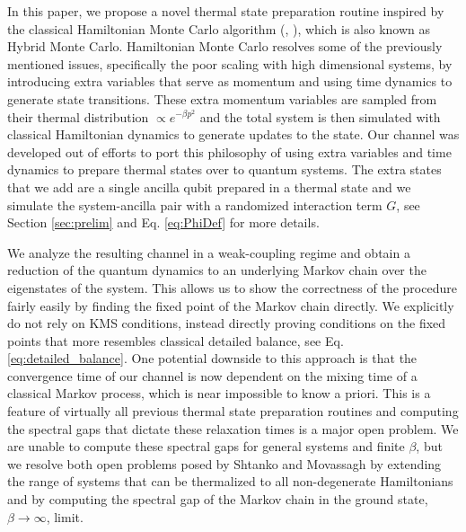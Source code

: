 In this paper, we propose a novel thermal state preparation routine inspired by the classical Hamiltonian Monte Carlo algorithm (\cite{neal1993probabilistic}, \cite{hoffman2011nouturnsampleradaptivelysetting}), which is also known as Hybrid Monte Carlo. Hamiltonian Monte Carlo resolves some of the previously mentioned issues, specifically the poor scaling with high dimensional systems, by introducing extra variables that serve as momentum and using time dynamics to generate state transitions. These extra momentum variables are sampled from their thermal distribution $\propto e^{-\beta p^2}$ and the total system is then simulated with classical Hamiltonian dynamics to generate updates to the state. Our channel was developed out of efforts to port this philosophy of using extra variables and time dynamics to prepare thermal states over to quantum systems. The extra states that we add are a single ancilla qubit prepared in a thermal state and we simulate the system-ancilla pair with a randomized interaction term $G$, see Section \ref{sec:prelim} and Eq. \eqref{eq:PhiDef} for more details. 

We analyze the resulting channel in a weak-coupling regime and obtain a reduction of the quantum dynamics to an underlying Markov chain over the eigenstates of the system. This allows us to show the correctness of the procedure fairly easily by finding the fixed point of the Markov chain directly. We explicitly do not rely on KMS conditions, instead directly proving conditions on the fixed points that more resembles classical detailed balance, see Eq. \eqref{eq:detailed_balance}. One potential downside to this approach is that the convergence time of our channel is now dependent on the mixing time of a classical Markov process, which is near impossible to know a priori. This is a feature of virtually all previous thermal state preparation routines and computing the spectral gaps that dictate these relaxation times is a major open problem. We are unable to compute these spectral gaps for general systems and finite $\beta$, but we resolve both open problems posed by Shtanko and Movassagh \cite{shtanko2023preparingthermalstatesnoiseless} by extending the range of systems that can be thermalized to all non-degenerate Hamiltonians and by computing the spectral gap of the Markov chain in the ground state, $\beta \to \infty$, limit.


